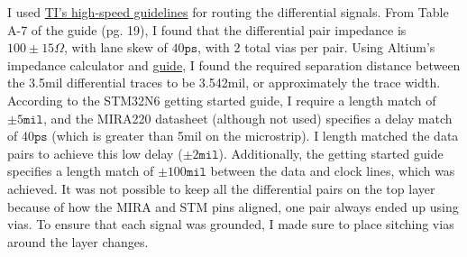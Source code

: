 I used \href{https://www.ti.com/lit/an/spraar7j/spraar7j.pdf?ts=1755945140120}{TI's high-speed guidelines} for routing the differential signals.
From Table A-7 of the guide (pg. 19), I found that the differential pair impedance is $100\pm15\Omega$, with lane skew of $40\texttt{ps}$, with 2 total vias per pair.
Using Altium's impedance calculator and \href{https://files.resources.altium.com/sites/default/files/2020-03/Impedance%20Calculation_fin2.pdf}{guide}, I found the required separation distance between the 3.5mil differential traces to be 3.542mil, or approximately the trace width.
According to the STM32N6 getting started guide, I require a length match of $\pm5\texttt{mil}$, and the MIRA220 datasheet (although not used) specifies a delay match of $40\texttt{ps}$ (which is greater than 5mil on the microstrip). I length matched the data pairs to achieve this low delay ($\pm2\texttt{mil}$).
Additionally, the getting started guide specifies a length match of $\pm100\texttt{mil}$ between the data and clock lines, which was achieved.
\nl
It was not possible to keep all the differential pairs on the top layer because of how the MIRA and STM pins aligned, one pair always ended up using vias. To ensure that each signal was grounded, I made sure to place sitching vias around the layer changes.
